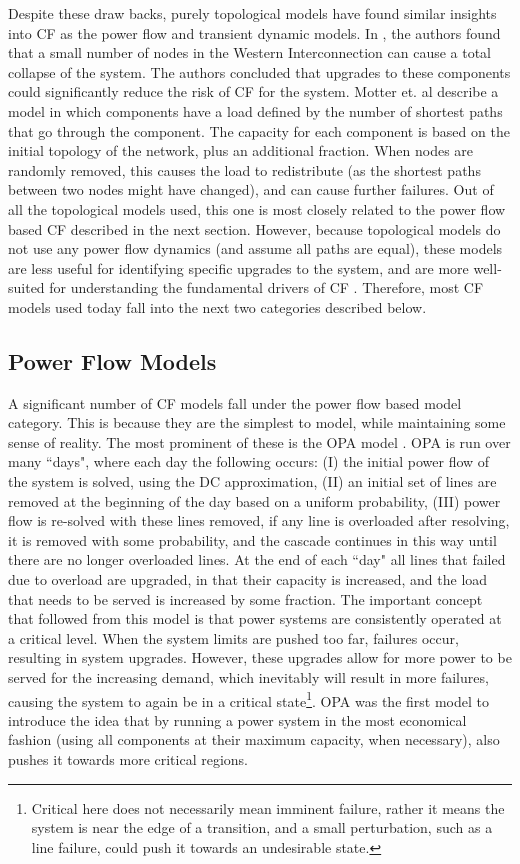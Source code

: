 Despite these draw backs, purely topological models have found similar insights into CF as the power flow and transient dynamic models.  In \cite{effic_harm}, the authors found that a small number of nodes in the Western Interconnection can cause a total collapse of the system.  The authors concluded that upgrades to these components could significantly reduce the risk of CF for the system.  Motter et. al \cite{Motter2002} describe a model in which components have a load defined by the number of shortest paths that go through the component.  The capacity for each component is based on the initial topology of the network, plus an additional fraction.  When nodes are randomly removed, this causes the load to redistribute (as the shortest paths between two nodes might have changed), and can cause further failures.  Out of all the topological models used, this one is most closely related to the power flow based CF described in the next section.  However, because topological models do not use any power flow dynamics (and assume all paths are equal), these models are less useful for identifying specific upgrades to the system, and are more well-suited for understanding the fundamental drivers of CF \cite{topology_good}.  Therefore, most CF models used today fall into the next two categories described below.

\subsection{Power Flow Models}

A significant number of CF models fall under the power flow based model category.  This is because they are the simplest to model, while maintaining some sense of reality.  The most prominent of these is the OPA model \cite{opa0}.  OPA is run over many ``days", where each day the following occurs: (I) the initial power flow of the system is solved, using the DC approximation, (II) an initial set of lines are removed at the beginning of the day based on a uniform probability, (III) power flow is re-solved with these lines removed, if any line is overloaded after resolving, it is removed with some probability, and the cascade continues in this way until there are no longer overloaded lines.  At the end of each ``day" all lines that failed due to overload are upgraded, in that their capacity is increased, and the load that needs to be served is increased by some fraction.  The important concept that followed from this model is that power systems are consistently operated at a critical level.  When the system limits are pushed too far, failures occur, resulting in system upgrades.  However, these upgrades allow for more power to be served for the increasing demand, which inevitably will result in more failures, causing the system to again be in a critical state\footnote{Critical here does not necessarily mean imminent failure, rather it means the system is near the edge of a transition, and a small perturbation, such as a line failure, could push it towards an undesirable state.}.  OPA was the first model to introduce the idea that by running a power system in the most economical fashion (using all components at their maximum capacity, when necessary), also pushes it towards more critical regions.


